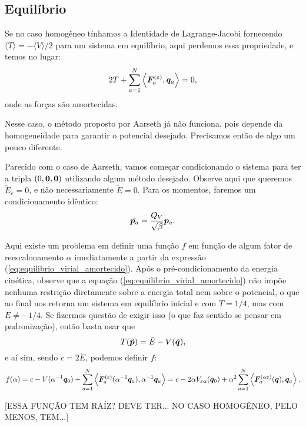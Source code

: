 \subsection{Equilíbrio}
Se no caso homogêneo tínhamos a Identidade de Lagrange-Jacobi fornecendo $\langle T \rangle = - \langle V \rangle /2$ para um sistema em equilíbrio, aqui perdemos essa propriedade, e temos no lugar:
\begin{equation}\label{eq:equilibrio_virial_amortecido}
    2 T + \sum_{a=1}^N \left\langle \bm F_a^{(\varepsilon)}, \bm q_a \right\rangle = 0,
\end{equation}
onde as forças são amortecidas.

Nesse caso, o método proposto por Aarseth já não funciona, pois depende da homogeneidade para garantir o potencial desejado. Precisamos então de algo um pouco diferente.

Parecido com o caso de Aarseth, vamos começar condicionando o sistema para ter a tripla $(0, \bm 0, \bm 0)$ utilizando algum método desejado. Observe aqui que queremos $\tilde E_\varepsilon = 0$, e não necessariamente $\tilde E = 0$. Para os momentos, faremos um condicionamento idêntico:
\begin{equation}
    \tilde{\bm p_a} = \dfrac{Q_V}{\sqrt \beta} \bm p_a.
\end{equation}

Aqui existe um problema em definir uma função $f$ em função de algum fator de reescalonamento $\alpha$ imediatamente a partir da expressão (\ref{eq:equilibrio_virial_amortecido}). Após o pré-condicionamento da energia cinética, observe que a equação (\ref{eq:equilibrio_virial_amortecido}) não impõe nenhuma restrição diretamente sobre a energia total nem sobre o potencial, o que ao final nos retorna um sistema em equilíbrio inicial e com $T=1/4$, mas com $E \neq -1/4$. Se fizermos questão de exigir isso (o que faz sentido se pensar em padronização), então basta usar que
$$
T(\tilde{\bm p}) = \tilde E - V(\tilde{\bm q}),
$$
e aí sim, sendo $c = 2\tilde E$, podemos definir $f$:
\begin{equation}
    f(\alpha) = c - V(\alpha^{-1} \bm q_0) + \sum_{a=1}^{N} \left\langle \bm F_a^{(\varepsilon)}(\alpha^{-1} \bm q_a), \alpha^{-1} \bm q_a \right\rangle
    = c - 2 \alpha V_{\varepsilon \alpha} (\bm q_0) + \alpha^{2} \sum_{a=1}^N \left\langle \bm F_a^{(\alpha \varepsilon)}(\bm q), \bm q_a \right\rangle.
\end{equation}

[ESSA FUNÇÃO TEM RAÍZ? DEVE TER... NO CASO HOMOGÊNEO, PELO MENOS, TEM...]

